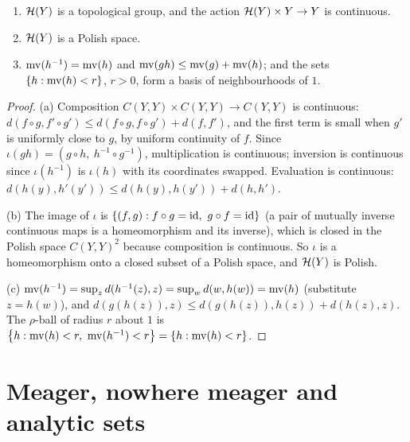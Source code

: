 \begin{proposition}\label{prop:homeo-group}
\begin{enumerate}[label=(\alph*)]
\item $\mathcal{H}(Y)$ is a topological group, and the action $\mathcal{H}(Y)\times Y\to Y$ is continuous.
\item $\mathcal{H}(Y)$ is a Polish space.
\item $\operatorname{mv}(h^{-1})=\operatorname{mv}(h)$ and $\operatorname{mv}(gh)\le\operatorname{mv}(g)+\operatorname{mv}(h)$; and the sets $\left\{ h:\operatorname{mv}(h)<r \right\}$, $r>0$,
form a basis of neighbourhoods of $1$.
\end{enumerate}
\end{proposition}

\begin{proof}
(a) Composition $C(Y,Y)\times C(Y,Y)\to C(Y,Y)$ is continuous: $d(f\circ g,f'\circ g')\le d(f\circ g,f\circ
g')+d(f,f')$, and the first term is small when $g'$ is uniformly close to $g$, by uniform continuity of
$f$. Since $\iota(gh)=(g\circ h,\ h^{-1}\circ g^{-1})$, multiplication is continuous; inversion is
continuous since $\iota(h^{-1})$ is $\iota(h)$ with its coordinates swapped. Evaluation is continuous:
$d(h(y),h'(y'))\le d(h(y),h(y'))+d(h,h')$.

(b) The image of $\iota$ is $\left\{ (f,g):f\circ g=\mathrm{id},\ g\circ f=\mathrm{id} \right\}$ (a pair of mutually
inverse continuous maps is a homeomorphism and its inverse), which is closed in the Polish space
$C(Y,Y)^2$ because composition is continuous. So $\iota$ is a homeomorphism onto a closed subset of a
Polish space, and $\mathcal{H}(Y)$ is Polish.

(c) $\operatorname{mv}(h^{-1})=\sup_zd(h^{-1}(z),z)=\sup_wd(w,h(w))=\operatorname{mv}(h)$ (substitute $z=h(w)$), and
$d(g(h(z)),z)\le d(g(h(z)),h(z))+d(h(z),z)$. The $\rho$-ball of radius $r$ about $1$ is
$\set{h:\mv(h)<r,\ \mv(h^{-1})<r}=\set{h:\mv(h)<r}$.
\end{proof}


\section{Meager, nowhere meager and analytic sets}


